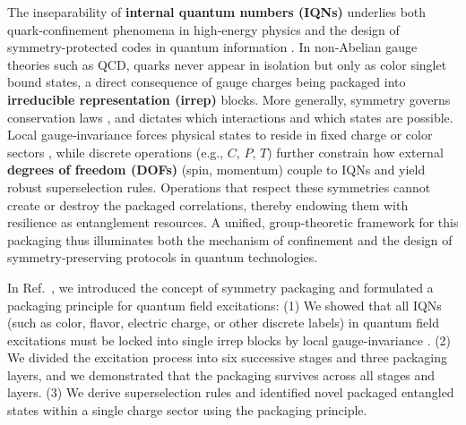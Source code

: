 \documentclass[12pt,a4paper]{article}
\begin{document}
The inseparability of \textbf{internal quantum numbers (IQNs)} underlies both quark‐confinement phenomena in high‐energy physics  \cite{Zweig1964,Wilson1974,Callan1976,GellMann2019} and the design of symmetry-protected codes in quantum information \cite{Kitaev2003,NielsenChuang2010}.
In non‐Abelian gauge theories such as QCD, quarks never appear in isolation but only as color singlet bound states, a direct consequence of gauge charges being packaged into \textbf{irreducible representation (irrep)} blocks.
More generally, symmetry governs conservation laws \cite{Noether1918}, and dictates which interactions \cite{Wigner1939,Pauli1940,Yang1954,Higgs1964,EnglertBrout1964,Nambu1961,Landau1957} and which states are possible.
Local gauge‐invariance forces physical states to reside in fixed charge or color sectors \cite{Zweig1964,Wilson1974,GellMann2019,Gross1973,Politzer1973}, while discrete operations (e.g., $C$, $P$, $T$) \cite{Luders1957} further constrain how external \textbf{degrees of freedom (DOFs)} (spin, momentum) couple to IQNs and yield robust superselection rules.
Operations that respect these symmetries cannot create or destroy the packaged correlations, thereby endowing them with resilience as entanglement resources.
A unified, group‐theoretic framework for this packaging thus illuminates both the mechanism of confinement and the design of symmetry‐preserving protocols in quantum technologies.  


In Ref.~\cite{MaSPI2025}, we introduced the concept of symmetry packaging and formulated a packaging principle for quantum field excitations:
(1) We showed that all IQNs (such as color, flavor, electric charge, or other discrete labels) in quantum field excitations must be locked into single irrep blocks \cite{Weyl1925,Wigner1939} by local gauge-invariance \cite{Feynman1949,Yang1954,Utiyama1956,Weinberg1967}.
(2) We divided the excitation process into six successive stages and three packaging layers, and we demonstrated that the packaging survives across all stages and layers.
(3) We derive superselection rules \cite{WWW1952,DHR1971,DHR1974,StreaterWightman2001} and identified novel packaged entangled states \cite{Ma2017} within a single charge sector using the packaging principle.
\end{document}
